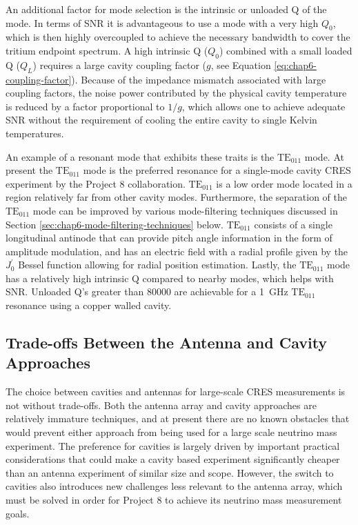 An additional factor for mode selection is the intrinsic or unloaded Q of the mode. In terms of SNR it is advantageous to use a mode with a very high $Q_0$, which is then highly overcoupled to achieve the necessary bandwidth to cover the tritium endpoint spectrum. A high intrinsic Q ($Q_0$) combined with a small loaded Q ($Q_L$) requires a large cavity coupling factor ($g$, see Equation \ref{eq:chap6-coupling-factor}). Because of the impedance mismatch associated with large coupling factors, the noise power contributed by the physical cavity temperature is reduced by a factor proportional to $1/g$, which allows one to achieve adequate SNR without the requirement of cooling the entire cavity to single Kelvin temperatures. 

An example of a resonant mode that exhibits these traits is the $\mathrm{TE}_{011}$ mode. At present the $\mathrm{TE}_{011}$ mode is the preferred resonance for a single-mode cavity CRES experiment by the Project 8 collaboration. $\mathrm{TE}_{011}$ is a low order mode located in a region relatively far from other cavity modes. Furthermore, the separation of the $\mathrm{TE}_{011}$ mode can be improved by various mode-filtering techniques discussed in Section \ref{sec:chap6-mode-filtering-techniques} below. $\mathrm{TE}_{011}$ consists of a single longitudinal antinode that can provide pitch angle information in the form of amplitude modulation, and has an electric field with a radial profile given by the $J_0^\prime$ Bessel function allowing for radial position estimation. Lastly, the $\mathrm{TE}_{011}$ mode has a relatively high intrinsic Q compared to nearby modes, which helps with SNR. Unloaded Q's greater than 80000 are achievable for a 1~GHz $\mathrm{TE}_{011}$ resonance using a copper walled cavity. 

\subsection{Trade-offs Between the Antenna and Cavity Approaches}

The choice between cavities and antennas for large-scale CRES measurements is not without trade-offs. Both the antenna array and cavity approaches are relatively immature techniques, and at present there are no known obstacles that would prevent either approach from being used for a large scale neutrino mass experiment. The preference for cavities is largely driven by important practical considerations that could make a cavity based experiment significantly cheaper than an antenna experiment of similar size and scope. However, the switch to cavities also introduces new challenges less relevant to the antenna array, which must be solved in order for Project 8 to achieve its neutrino mass measurement goals. 

